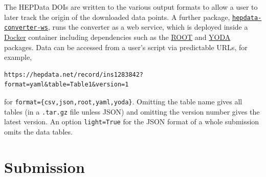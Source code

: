 \documentclass[a4paper]{jpconf}
\begin{document}
%
The HEPData DOIs are written to the various output formats to allow a user to
later track the origin of the downloaded data points.  A further package,
\href{https://github.com/HEPData/hepdata-converter-ws}{\texttt{hepdata-converter-ws}},
runs the converter as a web service, which is deployed inside a
\href{https://www.docker.com}{Docker} container including dependencies such as
the \href{https://root.cern.ch}{ROOT} and
\href{https://yoda.hepforge.org}{YODA} packages.  Data can be accessed from a
user's script via predictable URLs, for example,
%
\begin{verbatim}
https://hepdata.net/record/ins1283842?format=yaml&table=Table1&version=1
\end{verbatim}
%
for \verb+format={csv,json,root,yaml,yoda}+.  Omitting the table name gives
all tables (in a \texttt{.tar.gz} file unless JSON) and omitting the version
number gives the latest version.  An option \texttt{light=True} for the JSON
format of a whole submission omits the data tables.

\section{Submission}
\end{document}
